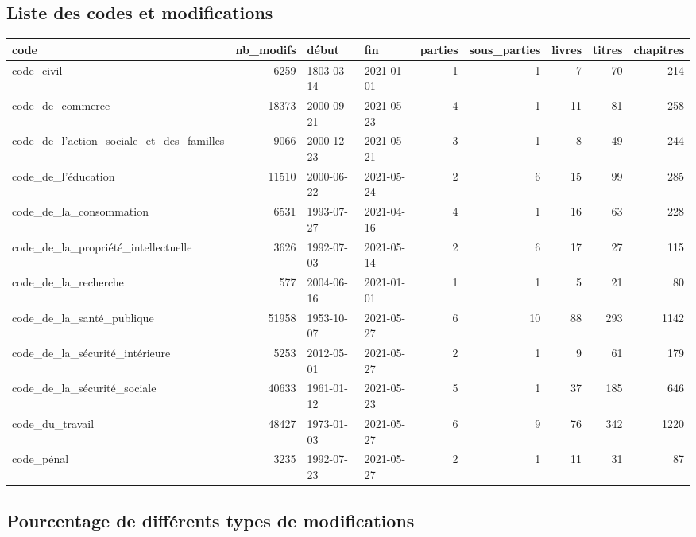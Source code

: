 \documentclass[
  oneside]{book}
\begin{document}
\hypertarget{liste-des-codes-et-modifications}{%
\subsection{Liste des codes et modifications}\label{liste-des-codes-et-modifications}}

\begin{tabular}{l|r|l|l|r|r|r|r|r}
\hline
code & nb\_modifs & début & fin & parties & sous\_parties & livres & titres & chapitres\\
\hline
code\_civil & 6259 & 1803-03-14 & 2021-01-01 & 1 & 1 & 7 & 70 & 214\\
\hline
code\_de\_commerce & 18373 & 2000-09-21 & 2021-05-23 & 4 & 1 & 11 & 81 & 258\\
\hline
code\_de\_l'action\_sociale\_et\_des\_familles & 9066 & 2000-12-23 & 2021-05-21 & 3 & 1 & 8 & 49 & 244\\
\hline
code\_de\_l'éducation & 11510 & 2000-06-22 & 2021-05-24 & 2 & 6 & 15 & 99 & 285\\
\hline
code\_de\_la\_consommation & 6531 & 1993-07-27 & 2021-04-16 & 4 & 1 & 16 & 63 & 228\\
\hline
code\_de\_la\_propriété\_intellectuelle & 3626 & 1992-07-03 & 2021-05-14 & 2 & 6 & 17 & 27 & 115\\
\hline
code\_de\_la\_recherche & 577 & 2004-06-16 & 2021-01-01 & 1 & 1 & 5 & 21 & 80\\
\hline
code\_de\_la\_santé\_publique & 51958 & 1953-10-07 & 2021-05-27 & 6 & 10 & 88 & 293 & 1142\\
\hline
code\_de\_la\_sécurité\_intérieure & 5253 & 2012-05-01 & 2021-05-27 & 2 & 1 & 9 & 61 & 179\\
\hline
code\_de\_la\_sécurité\_sociale & 40633 & 1961-01-12 & 2021-05-23 & 5 & 1 & 37 & 185 & 646\\
\hline
code\_du\_travail & 48427 & 1973-01-03 & 2021-05-27 & 6 & 9 & 76 & 342 & 1220\\
\hline
code\_pénal & 3235 & 1992-07-23 & 2021-05-27 & 2 & 1 & 11 & 31 & 87\\
\hline
\end{tabular}

\hypertarget{pourcentage-de-diffuxe9rents-types-de-modifications}{%
\subsection{Pourcentage de différents types de modifications}\label{pourcentage-de-diffuxe9rents-types-de-modifications}}
\end{document}

